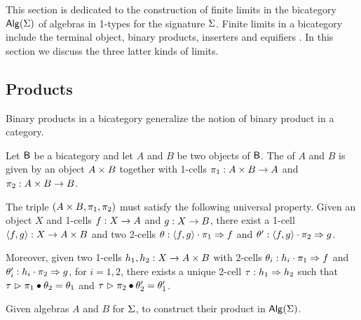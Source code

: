 This section is dedicated to the construction of finite limits in the
bicategory $\mathsf{Alg}(\Sigma)$ of algebras in 1-types for the signature
$\Sigma$.  Finite limits in a bicategory include the terminal object,
binary products, inserters and equifiers
\cite{power1991characterization}. In this section we discuss the three
latter kinds of limits.

\subsection{Products}

Binary products in a bicategory generalize the notion of binary
product in a category.

\begin{definition}\label{def:product}
Let $\mathsf{B}$ be a bicategory and let $A$ and $B$ be two objects of
$\mathsf{B}$. The  of $A$ and $B$ is given by an object $A \times B$ together with 1-cells $\pi_1 : A \times B \rightarrow A$ and
$\pi_2 : A \times B \rightarrow B$.

The triple $(A \times B,\pi_1, \pi_2)$ must satisfy the following
universal property. Given an object $X$ and 1-cells $f : X
\rightarrow A$ and $g : X \rightarrow B$, there exist a 1-cell
$\langle f , g \rangle : X \rightarrow A \times B$ and two 2-cells $\theta :
\langle f , g \rangle \cdot \pi_1 \Rightarrow f$ and $\theta' : \langle f , g \rangle
\cdot \pi_2 \Rightarrow g$.

Moreover, given two 1-cells $h_1,h_2 : X \rightarrow A \times B$ with
2-cells $\theta_i : h_i \cdot \pi_1 \Rightarrow f$ and $\theta'_i : h_i
\cdot \pi_2 \Rightarrow g$, for $i= 1,2$, there exists a unique
2-cell $\tau : h_1 \Rightarrow h_2$ such that $\tau \vartriangleright
\pi_1 \bullet \theta_2 = \theta_1$ and $\tau \vartriangleright \pi_2 \bullet
\theta'_2 = \theta'_1$.
\end{definition} 

\begin{problem}
\label{prob:product}
Given algebras $A$ and $B$ for $\Sigma$, to construct their product in $\mathsf{Alg}(\Sigma)$.
\end{problem}

